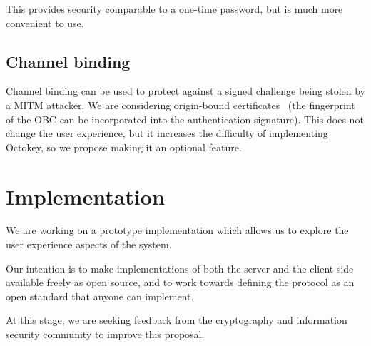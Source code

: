 \documentclass{acm_proc_article-sp}
\begin{document}
This provides security comparable to a one-time password, but is much more convenient to use.

\subsection{Channel binding}

Channel binding can be used to protect against a signed challenge being stolen by a MITM attacker.
We are considering origin-bound certificates~\cite{Dietz12} (the fingerprint of the OBC can be
incorporated into the authentication signature). This does not change the user experience, but it
increases the difficulty of implementing Octokey, so we propose making it an optional feature.

\section{Implementation}

We are working on a prototype implementation which allows us to explore the user experience aspects
of the system.

Our intention is to make implementations of both the server and the client side available freely as
open source, and to work towards defining the protocol as an open standard that anyone can
implement.

At this stage, we are seeking feedback from the cryptography and information security community to
improve this proposal.

{}

\end{document}
